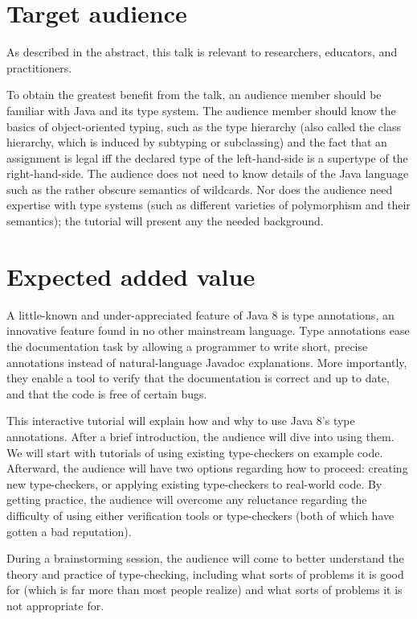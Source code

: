 \documentclass{llncs} %
\begin{document}
\section{Target audience}

As described in the abstract, this talk is relevant to researchers,
educators, and practitioners.

To obtain the greatest benefit from the talk, an audience member should be
familiar with Java and its type system.  The audience member should know
the basics of object-oriented typing, such as the type hierarchy (also
called the class hierarchy, which is induced by subtyping or subclassing)
and the fact that an assignment is legal iff the declared type of the
left-hand-side is a supertype of the right-hand-side.  The audience does
not need to know details of the Java language such as the rather obscure
semantics of wildcards.  Nor does the audience need expertise with type
systems (such as different varieties of polymorphism and their semantics);
the tutorial will present any the needed background.

\section{Expected added value}

A little-known and under-appreciated feature of Java 8 is type annotations, an
innovative feature found in no other mainstream language.  Type annotations
ease the documentation task by allowing a programmer to write short,
precise annotations instead of natural-language Javadoc explanations.  More
importantly, they enable a tool to verify that the documentation is correct
and up to date, and that the code is free of certain bugs.

This interactive tutorial will explain how and why to use Java 8's type
annotations.  After a brief introduction, the audience will dive into using
them.  We will start with tutorials of using existing type-checkers on
example code.  Afterward, the audience will have two options regarding how
to proceed:  creating new type-checkers, or applying existing type-checkers
to real-world code.  By getting practice, the audience will overcome any
reluctance regarding the difficulty of using either verification tools or
type-checkers (both of which have gotten a bad reputation).

During a brainstorming session, the audience will come to better understand
the theory and practice of type-checking, including what sorts of problems
it is good for (which is far more than most people realize) and what sorts
of problems it is not appropriate for.
\end{document}
